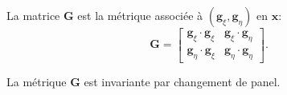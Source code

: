 \begin{definition}
La matrice $\mathbf{G}$ est la métrique associée à $(\mathbf{g}_{\xi}, \mathbf{g}_{\eta})$ en $\mathbf{x}$:
\begin{equation}
\mathbf{G} = \begin{bmatrix}
\mathbf{g}_{\xi} \cdot \mathbf{g}_{\xi} & \mathbf{g}_{\xi} \cdot \mathbf{g}_{\eta} \\
\mathbf{g}_{\eta} \cdot \mathbf{g}_{\xi} & \mathbf{g}_{\eta} \cdot \mathbf{g}_{\eta}
\end{bmatrix} .
\end{equation}
\end{definition}

\begin{proposition}
La métrique $\mathbf{G}$ est invariante par changement de panel.
\end{proposition}

